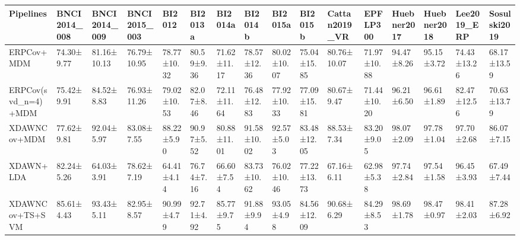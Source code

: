 \begin{tabular}{llllllllllllllll}
\toprule
Pipelines & BNCI2014\_008 & BNCI2014\_009 & BNCI2015\_003 & BI2012 & BI2013a & BI2014a & BI2014b & BI2015a & BI2015b & Cattan2019\_VR & EPFLP300 & Huebner2017 & Huebner2018 & Lee2019\_ERP & Sosulski2019 \\
\midrule
ERPCov+MDM & 74.30±9.77 & 81.16±10.13 & 76.79±10.95 & 78.77±10.32 & 80.59±9.36 & 71.62±11.17 & 78.57±12.36 & 80.02±10.07 & 75.04±15.85 & 80.76±10.07 & 71.97±10.88 & 94.47±8.26 & 95.15±3.72 & 74.43±13.26 & 68.17±13.59 \\
ERPCov(svd\_n=4)+MDM & 75.42±9.91 & 84.52±8.83 & 76.93±11.26 & 79.02±10.53 & 82.07±8.46 & 72.11±11.64 & 76.48±12.83 & 77.92±10.33 & 77.09±15.81 & 80.67±9.47 & 71.44±10.20 & 96.21±6.50 & 96.61±1.89 & 82.47±12.56 & 70.63±13.79 \\
XDAWNCov+MDM & 77.62±9.81 & 92.04±5.97 & 83.08±7.55 & 88.22±5.90 & 90.97±5.52 & 80.88±11.01 & 91.58±10.02 & 92.57±5.03 & 83.48±12.05 & 88.53±7.34 & 83.20±9.05 & 98.07±2.09 & 97.78±1.04 & 97.70±2.68 & 86.07±7.15 \\
XDAWN+LDA & 82.24±5.26 & 64.03±3.91 & 78.62±7.19 & 64.41±4.14 & 76.74±7.16 & 66.60±7.54 & 83.73±10.62 & 76.02±10.46 & 77.22±13.73 & 67.16±6.11 & 62.98±5.38 & 97.74±2.84 & 97.54±1.58 & 96.45±3.93 & 67.49±7.44 \\
XDAWNCov+TS+SVM & 85.61±4.43 & 93.43±5.11 & 82.95±8.57 & 90.99±4.79 & 92.71±4.92 & 85.77±9.75 & 91.88±9.94 & 93.05±4.98 & 84.56±12.09 & 90.68±6.29 & 84.29±8.53 & 98.69±1.78 & 98.47±0.97 & 98.41±2.03 & 87.28±6.92 \\
\bottomrule
\end{tabular}

